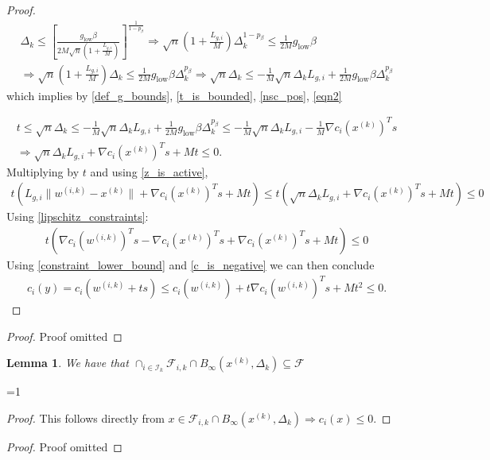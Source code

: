 \documentclass{article}
\newtheorem{lemma}[theorem]{Lemma}
\theoremstyle{case}
\newcommand{\xk}{{x^{(k)}}}
\newcommand{\dk}{\Delta_k}
\newcommand{\feasible}{{\mathcal F}}
\newcommand{\fik}{{\mathcal F_{i, k}}}
\newcommand{\iik}{{\mathcal I_{k}}}
\newcommand{\wik}{{w^{(i, k)}}}
\newcommand{\lgi}{{L_{g, i}}}
\newcommand{\tr}{{ B_{\infty}\left(\xk, \dk\right) }}
\newcommand{\mingrad}{{ g_{\text{low}} }}
\def\includeproofs{1}
\begin{document}
\begin{proof}
\begin{align}
\dk \le \left[\frac {\mingrad  \beta} {2M\sqrt{n}\left(1 + \frac {\lgi} M \right)}\right]^{\frac1 {1 - p_{\beta}} }
\Longrightarrow \sqrt{n}\left(1 + \frac {\lgi} M \right) \dk^{1-p_{\beta}}\le \frac 1 {2M} \mingrad  \beta \nonumber \\
\Longrightarrow \sqrt{n}\left(1 + \frac {\lgi} M \right) \dk \le \frac 1 {2M} \mingrad  \beta \dk^{p_{\beta}}
\Longrightarrow \sqrt{n} \dk \le -\frac 1 M \sqrt{n}\dk \lgi + \frac 1 {2M} \mingrad  \beta \dk^{p_{\beta}} \label{eqn2}
\end{align}
which implies by \cref{def_g_bounds}, \cref{t_is_bounded}, \cref{nsc_pos}, \cref{eqn2}

\begin{align*}
t 
\le \sqrt{n} \dk 
\le -\frac 1 M \sqrt{n}\dk \lgi + \frac 1 {2M} \mingrad \beta \dk^{p_{\beta}}
\le -\frac 1 M \sqrt{n}\dk \lgi -\frac 1 M \nabla c_i(\xk)^Ts \\
\Longrightarrow \sqrt{n}\dk \lgi + \nabla c_i(\xk)^Ts + M t \le 0.
\end{align*}
Multiplying by $t$ and using \cref{z_is_active},
\begin{align*}
 t \left(\lgi\|\wik - \xk\| + \nabla c_i(\xk)^Ts + M t\right) \le t \left(\sqrt{n}\dk \lgi + \nabla c_i(\xk)^Ts + M t\right) \le 0
\end{align*}
Using \cref{lipschitz_constraints}:
\begin{align*}
t \left(\nabla c_i(\wik)^Ts - \nabla c_i(\xk)^Ts + \nabla c_i(\xk)^Ts + M t\right) \le 0
\end{align*}
Using \cref{constraint_lower_bound} and \cref{c_is_negative} we can then conclude
\begin{align*}
c_i(y) = c_i(\wik + ts) \le c_i(\wik) + t\nabla c_i(\wik)^Ts + M t^2 \le 0.
\end{align*}

\end{proof}
\else
\begin{proof}
Proof omitted
\end{proof}
\fi



\begin{lemma}
We have that $\cap_{i \in \iik} \fik \cap \tr \subseteq \feasible$ 
\end{lemma}

\ifnum\includeproofs=1
\begin{proof}
This follows directly from $x \in \fik \cap \tr \Longrightarrow c_i(x) \le 0$.
\end{proof}
\else
\begin{proof}
Proof omitted
\end{proof}
\fi
\end{document}
